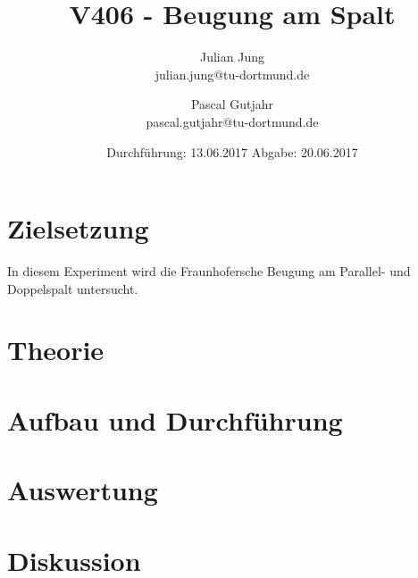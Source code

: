 

\title{V406 - Beugung am Spalt}
\author{Julian Jung \\ julian.jung@tu-dortmund.de
  \and Pascal Gutjahr \\ pascal.gutjahr@tu-dortmund.de}
  \date{Durchführung: 13.06.2017
  \hspace{3em}
  Abgabe: 20.06.2017}
  
\maketitle
\newpage
\tableofcontents
\newpage
\section{Zielsetzung}
In diesem Experiment wird die Fraunhofersche Beugung am Parallel- und
Doppelspalt untersucht.
\section{Theorie}
 
\section{Aufbau und Durchführung}
 
\section{Auswertung}
 
\section{Diskussion}

\printbibliography

